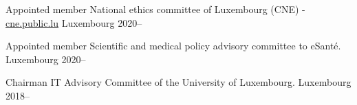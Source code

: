 

\begin{cvhonors}

  \cvhonor
    {Appointed member} %
    {National ethics committee of Luxembourg (CNE) - \href{cne.public.lu.}{cne.public.lu}} %
    {Luxembourg} %
    {2020--} %

  \cvhonor
    {Appointed member} %
    {Scientific and medical policy advisory committee to eSanté.} %
    {Luxembourg} %
    {2020--} %

  \cvhonor
    {Chairman} %
    {IT Advisory Committee of the University of Luxembourg.} %
    {Luxembourg} %
    {2018--} %

\end{cvhonors}
